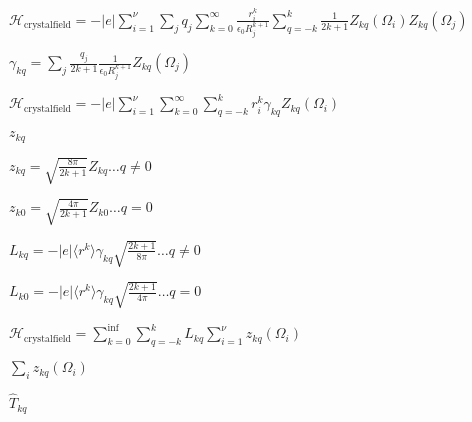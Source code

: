 \documentclass[twoside]{article}
\def\lthtmlcheckvsize{\ifdim\ht\sizebox<\vsize 
  \ifdim\wd\sizebox<\hsize\expandafter\hfill\fi \expandafter\vfill
  \else\expandafter\vss\fi}%
\begin{document}
{\newpage\clearpage
{}%
$\displaystyle \mathcal H_{\mathrm{crystalfield}}=-|e|\sum_{i=1}^\nu \sum_j q_j \sum_{k=0}^{\infty}\frac{r_i^k}{\epsilon_0 R_j^{k+1}} \sum_{q=-k}^k \frac{1}{2k+1} %
Z_{kq}(\Omega_i)Z_{kq}(\Omega_j)
$%
\lthtmlindisplaymathZ
\lthtmlcheckvsize\clearpage}

{\newpage\clearpage
{}%
$\displaystyle \gamma_{kq}=\sum_j \frac{q_j}{2k+1}\frac{1}{\epsilon_0R_j^{k+1}}Z_{kq}(\Omega_j)
$%
\lthtmlindisplaymathZ
\lthtmlcheckvsize\clearpage}

{\newpage\clearpage
{}%
$\displaystyle \mathcal H_{\mathrm{crystalfield}}=-|e| \sum_{i=1}^\nu \sum_{k=0}^{\infty} \sum_{q=-k}^k r_i^k \gamma_{kq}Z_{kq}(\Omega_i)
$%
\lthtmlindisplaymathZ
\lthtmlcheckvsize\clearpage}

{\newpage\clearpage
{}%
$z_{kq}$%
\lthtmlindisplaymathZ
\lthtmlcheckvsize\clearpage}

{\newpage\clearpage
{}%
$\displaystyle z_{kq}=\sqrt{\frac{8\pi}{2k+1}}Z_{kq} \dots q\neq 0$%
\lthtmlindisplaymathZ
\lthtmlcheckvsize\clearpage}

{\newpage\clearpage
{}%
$\displaystyle z_{k0}=\sqrt{\frac{4\pi}{2k+1}}Z_{k0} \dots q=0$%
\lthtmlindisplaymathZ
\lthtmlcheckvsize\clearpage}

{\newpage\clearpage
{}%
$\displaystyle L_{kq}=-|e|\langle r^k \rangle \gamma_{kq}\sqrt{\frac{2k+1}{8\pi}} \dots q\neq 0$%
\lthtmlindisplaymathZ
\lthtmlcheckvsize\clearpage}

{\newpage\clearpage
{}%
$\displaystyle L_{k0}=-|e|\langle r^k \rangle \gamma_{kq}\sqrt{\frac{2k+1}{4\pi}} \dots q= 0$%
\lthtmlindisplaymathZ
\lthtmlcheckvsize\clearpage}

{\newpage\clearpage
{}%
$\displaystyle \mathcal H_{\mathrm{crystalfield}}=  \sum_{k=0}^{\inf} \sum_{q=-k}^k  L_{kq} \sum_{i=1}^\nu z_{kq}(\Omega_i)
$%
\lthtmlindisplaymathZ
\lthtmlcheckvsize\clearpage}

{\newpage\clearpage
{}%
$\sum_i z_{kq}(\Omega_i)$%
\lthtmlindisplaymathZ
\lthtmlcheckvsize\clearpage}

{\newpage\clearpage
{}%
$\hat{T}_{kq}$%
\lthtmlindisplaymathZ
\lthtmlcheckvsize\clearpage}
\end{document}
